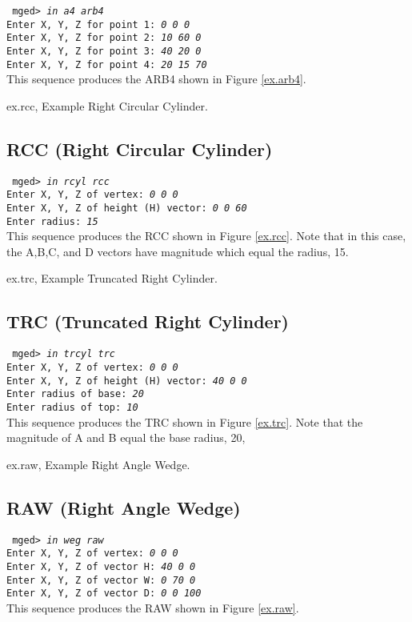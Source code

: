 {\tt
mged> {\em in a4 arb4} \\
Enter X, Y, Z for point 1: {\em 0 0 0} \\
Enter X, Y, Z for point 2: {\em 10 60 0} \\
Enter X, Y, Z for point 3: {\em 40 20 0} \\
Enter X, Y, Z for point 4: {\em 20 15 70} \\
}
This sequence produces the ARB4 shown in Figure \ref{ex.arb4}.

\mfig ex.rcc, Example Right Circular Cylinder.
\subsection{RCC (Right Circular Cylinder)}

{\tt
mged> {\em in rcyl rcc} \\
Enter X, Y, Z of vertex: {\em 0 0 0} \\
Enter X, Y, Z of height (H) vector: {\em 0 0 60} \\
Enter radius: {\em 15} \\
}
This sequence produces the RCC shown in Figure \ref{ex.rcc}.
Note that in this case, the A,B,C, and D vectors have magnitude
which equal the radius, 15.

\mfig ex.trc, Example Truncated Right Cylinder.
\subsection{TRC (Truncated Right Cylinder)}

{\tt
mged> {\em in trcyl trc} \\
Enter X, Y, Z of vertex: {\em 0 0 0} \\
Enter X, Y, Z of height (H) vector: {\em 40 0 0} \\
Enter radius of base: {\em 20} \\
Enter radius of top: {\em 10} \\
}
This sequence produces the TRC shown in Figure \ref{ex.trc}.
Note that the magnitude of A and B equal the base radius, 20,

\mfig ex.raw, Example Right Angle Wedge.
\subsection{RAW (Right Angle Wedge)}

{\tt
mged> {\em in weg raw} \\
Enter X, Y, Z of vertex: {\em 0 0 0} \\
Enter X, Y, Z of vector H: {\em 40 0 0} \\
Enter X, Y, Z of vector W: {\em 0 70 0} \\
Enter X, Y, Z of vector D: {\em 0 0 100} \\
}
This sequence produces the RAW shown in Figure \ref{ex.raw}.


